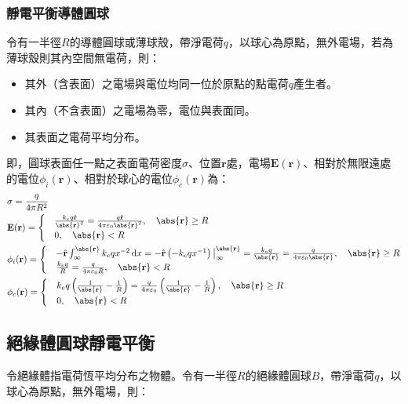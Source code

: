 \documentclass[a4paper,12pt]{report}
\begin{document}
\begin{itemize}
\subsubsection{靜電平衡導體圓球}
令有一半徑$R$的導體圓球或薄球殼，帶淨電荷$q$，以球心為原點，無外電場，若為薄球殼則其內空間無電荷，則：
\begin{itemize}
\item 其外（含表面）之電場與電位均同一位於原點的點電荷$q$產生者。
\item 其內（不含表面）之電場為零，電位與表面同。
\item 其表面之電荷平均分布。
\end{itemize}
即，圓球表面任一點之表面電荷密度$\sigma$、位置$\mathbf{r}$處，電場$\mathbf{E}(\mathbf{r})$、相對於無限遠處的電位$\phi_i(\mathbf{r})$、相對於球心的電位$\phi_c(\mathbf{r})$為：
\[\begin{aligned}
& \sigma=\frac{q}{4\pi R^2}\\
& \mathbf{E}(\mathbf{r})=
\begin{cases}
& \frac{k_eq\hat{\mathbf{r}}}{\abs{\mathbf{r}}^2}=\frac{q\hat{\mathbf{r}}}{4\pi\varepsilon_0\abs{\mathbf{r}}^2},\quad\abs{\mathbf{r}}\geq R\\
& 0,\quad\abs{\mathbf{r}}<R
\end{cases}\\
& \phi_i(\mathbf{r}) = 
\begin{cases}
& -\hat{\mathbf{r}}\int_\infty^{\abs{\mathbf{r}}}k_eqx^{-2}\,\mathrm{d}x=-\hat{\mathbf{r}}\left(-k_eqx^{-1}\right)\big\vert_\infty^{\abs{\mathbf{r}}}=\frac{k_eq}{\abs{\mathbf{r}}}=\frac{q}{4\pi\varepsilon_0\abs{\mathbf{r}}},\quad\abs{\mathbf{r}}\geq R\\
& \frac{k_eq}{R}=\frac{q}{4\pi\varepsilon_0 R},\quad\abs{\mathbf{r}}<R
\end{cases}\\
& \phi_c(\mathbf{r}) = 
\begin{cases}
& k_eq\left(\frac{1}{\abs{\mathbf{r}}}-\frac{1}{R}\right)=\frac{q}{4\pi\varepsilon_0}\left(\frac{1}{\abs{\mathbf{r}}}-\frac{1}{R}\right),\quad\abs{\mathbf{r}}\geq R\\
& 0,\quad\abs{\mathbf{r}}<R
\end{cases}
\end{aligned}\]
\subsection{絕緣體圓球靜電平衡}
令絕緣體指電荷恆平均分布之物體。令有一半徑$R$的絕緣體圓球$B$，帶淨電荷$q$，以球心為原點，無外電場，則：


\end{itemize}
\end{document}
